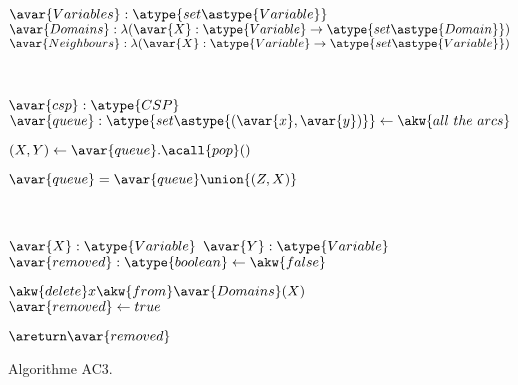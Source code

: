 \begin{figure}

\begin{center}
\begin{algorithmic}

\State $\avar{Variables}: \atype{set\astype{Variable}}$
\State $\avar{Domains}: \lambda (\avar{X}: \atype{Variable} \rightarrow \atype{set\astype{Domain}})$
\State $\avar{Neighbours}: \lambda (\avar{X}: \atype{Variable} \rightarrow \atype{set\astype{Variable}})$

\\\hrulefill


  \Require $\avar{csp}: \atype{CSP}$
  \State $\avar{queue}: \atype{set\astype{(\avar{x}, \avar{y})}} \gets \akw{all~the~arcs}$


      \State $(X, Y) \gets \avar{queue}.\acall{pop}()$



              \State $\avar{queue} = \avar{queue} \union \{(Z, X)\}$

          \EndFor

      \EndIf

  \EndWhile

\EndFunction

\\\hrulefill


    \Require $\avar{X}: \atype{Variable}$
    \Require $\avar{Y}: \atype{Variable}$
    \Ensure  $\avar{removed}: \atype{boolean} \gets \akw{false}$



            \State $\akw{delete} x \akw{from} \avar{Domains}(X)$
            \State $\avar{removed} \gets true$

        \EndIf

    \EndFor

    \State $\areturn \avar{removed}$

\EndFunction

\end{algorithmic}
\end{center}

\caption{\label{figure:data:ac3} Algorithme AC3.}

\end{figure}

